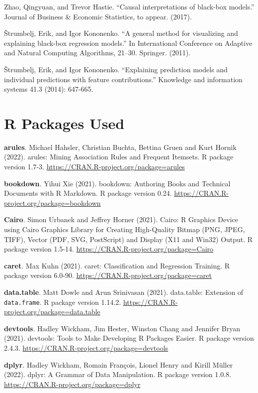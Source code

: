\documentclass[
  10pt,
]{scrbook}
\begin{document}
Zhao, Qingyuan, and Trevor Hastie. ``Causal interpretations of black-box models.'' Journal of Business \& Economic Statistics, to appear. (2017).

Štrumbelj, Erik, and Igor Kononenko. ``A general method for visualizing and explaining black-box regression models.'' In International Conference on Adaptive and Natural Computing Algorithms, 21--30. Springer. (2011).

Štrumbelj, Erik, and Igor Kononenko. ``Explaining prediction models and individual predictions with feature contributions.'' Knowledge and information systems 41.3 (2014): 647-665.

\hypertarget{r-packages-used}{%
\section*{R Packages Used}\label{r-packages-used}}


\textbf{arules}. Michael Hahsler, Christian Buchta, Bettina Gruen and Kurt Hornik (2022). arules: Mining Association Rules and Frequent Itemsets. R package version 1.7-3. \url{https://CRAN.R-project.org/package=arules}

\textbf{bookdown}. Yihui Xie (2021). bookdown: Authoring Books and Technical Documents with R Markdown. R package version 0.24. \url{https://CRAN.R-project.org/package=bookdown}

\textbf{Cairo}. Simon Urbanek and Jeffrey Horner (2021). Cairo: R Graphics Device using Cairo Graphics Library for Creating
High-Quality Bitmap (PNG, JPEG, TIFF), Vector (PDF, SVG,
PostScript) and Display (X11 and Win32) Output. R package version 1.5-14. \url{https://CRAN.R-project.org/package=Cairo}

\textbf{caret}. Max Kuhn (2021). caret: Classification and Regression Training. R package version 6.0-90. \url{https://CRAN.R-project.org/package=caret}

\textbf{data.table}. Matt Dowle and Arun Srinivasan (2021). data.table: Extension of \texttt{data.frame}. R package version 1.14.2. \url{https://CRAN.R-project.org/package=data.table}

\textbf{devtools}. Hadley Wickham, Jim Hester, Winston Chang and Jennifer Bryan (2021). devtools: Tools to Make Developing R Packages Easier. R package version 2.4.3. \url{https://CRAN.R-project.org/package=devtools}

\textbf{dplyr}. Hadley Wickham, Romain François, Lionel Henry and Kirill Müller (2022). dplyr: A Grammar of Data Manipulation. R package version 1.0.8. \url{https://CRAN.R-project.org/package=dplyr}
\end{document}
